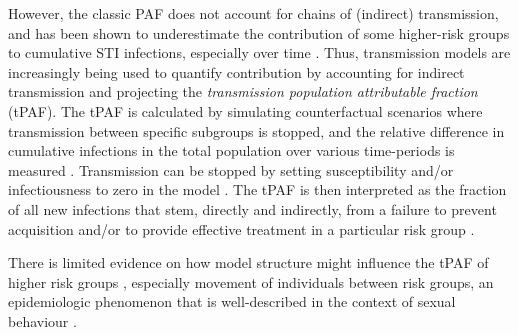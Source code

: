 However, the classic PAF does not account for chains of (indirect) transmission, and has been
shown to underestimate the contribution of some higher-risk groups to cumulative
STI infections, especially over time \citep{Mishra2014}.
Thus, transmission models are increasingly being used to quantify
contribution by accounting for indirect transmission and projecting
the \textit{transmission population attributable fraction} (tPAF).
The tPAF is calculated by
simulating counterfactual scenarios where transmission
between specific subgroups is stopped, and
the relative difference in cumulative infections in the total population
over various time-periods is measured \citep{Mishra2014,Mukandavire2018}.
Transmission can be stopped by
setting susceptibility and/or infectiousness to zero in the model \citep{Mishra2014}.
The tPAF is then interpreted as
the fraction of all new infections that stem, directly and indirectly, from
a failure to prevent acquisition and/or to provide effective treatment
in a particular risk group \citep{Mishra2016,Mukandavire2018,Maheu-Giroux2017}.
\par
There is limited evidence on how model structure 
might influence the tPAF of higher risk groups
\citep{Mishra2016,Mukandavire2018,Maheu-Giroux2017},
especially movement of individuals between risk groups,
an epidemiologic phenomenon  that is well-described
in the context of sexual behaviour \citep{Watts2010}.
